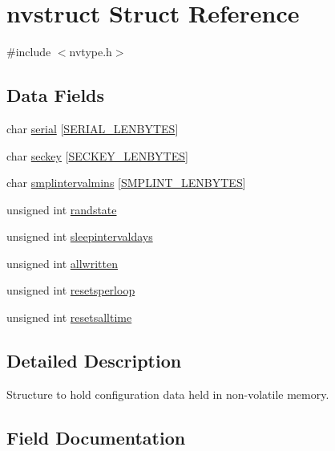 \hypertarget{structnvstruct}{}\section{nvstruct Struct Reference}
\label{structnvstruct}


{\ttfamily \#include $<$nvtype.\+h$>$}

\subsection*{Data Fields}
\begin{DoxyCompactItemize}
\item 
char \mbox{\hyperlink{structnvstruct_a8c4928cc85c5336514401eb142ea7d50}{serial}} \mbox{[}\mbox{\hyperlink{nvtype_8h_a09589b0f4cf4e32679b6dc064903edef}{S\+E\+R\+I\+A\+L\+\_\+\+L\+E\+N\+B\+Y\+T\+ES}}\mbox{]}
\item 
char \mbox{\hyperlink{structnvstruct_a680c038327bbd20d30beade8d0ef1dd4}{seckey}} \mbox{[}\mbox{\hyperlink{nvtype_8h_ae32c9007f59a1d55426d7fd63e10d589}{S\+E\+C\+K\+E\+Y\+\_\+\+L\+E\+N\+B\+Y\+T\+ES}}\mbox{]}
\item 
char \mbox{\hyperlink{structnvstruct_a34de27bbd20aa5f15e4e4482ce5a0309}{smplintervalmins}} \mbox{[}\mbox{\hyperlink{nvtype_8h_a44d3fb460b6c9383a2b3248544aa13d0}{S\+M\+P\+L\+I\+N\+T\+\_\+\+L\+E\+N\+B\+Y\+T\+ES}}\mbox{]}
\item 
unsigned int \mbox{\hyperlink{structnvstruct_aec7e67f64e6ee88dda940f1b837f9351}{randstate}}
\item 
unsigned int \mbox{\hyperlink{structnvstruct_a7535c524cca52dcf1e60b1e6762fea4c}{sleepintervaldays}}
\item 
unsigned int \mbox{\hyperlink{structnvstruct_a3fee61ddd1d863385c81b1d53599191a}{allwritten}}
\item 
unsigned int \mbox{\hyperlink{structnvstruct_a48f727b15838a972aff7c7d7397ff641}{resetsperloop}}
\item 
unsigned int \mbox{\hyperlink{structnvstruct_a045498ec4eca300d51f030a958ed5ee1}{resetsalltime}}
\end{DoxyCompactItemize}


\subsection{Detailed Description}
Structure to hold configuration data held in non-\/volatile memory. 

\subsection{Field Documentation}
\mbox{\label{structnvstruct_a3fee61ddd1d863385c81b1d53599191a}} 
